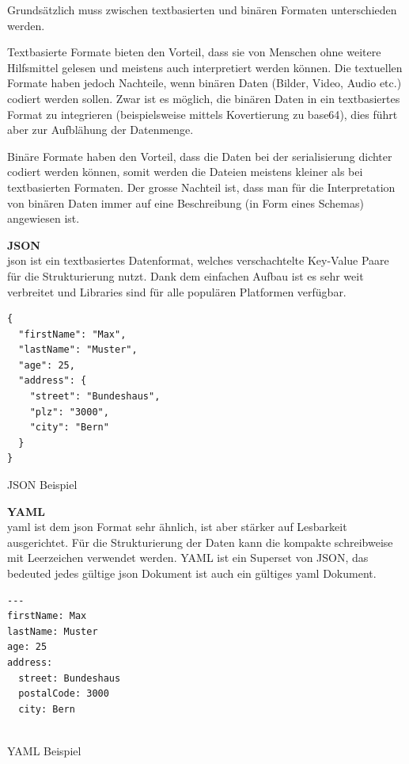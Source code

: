 Grundsätzlich muss zwischen textbasierten und binären Formaten unterschieden werden.

Textbasierte Formate bieten den Vorteil, dass sie von Menschen ohne weitere Hilfsmittel gelesen und meistens auch interpretiert werden können. Die textuellen Formate haben jedoch Nachteile, wenn binären Daten (Bilder, Video, Audio etc.) codiert werden sollen. Zwar ist es möglich, die binären Daten in ein textbasiertes Format zu integrieren (beispielsweise mittels Kovertierung zu \gls{base64}), dies führt aber zur Aufblähung der Datenmenge.

Binäre Formate haben den Vorteil, dass die Daten bei der \gls{serialisierung} dichter codiert werden können, somit werden die Dateien meistens kleiner als bei textbasierten Formaten. Der grosse Nachteil ist, dass man für die Interpretation von binären Daten immer auf eine Beschreibung (in Form eines Schemas) angewiesen ist.

\textbf{JSON} \\
\gls{json} ist ein textbasiertes Datenformat, welches verschachtelte Key-Value Paare für die Strukturierung nutzt. Dank dem einfachen Aufbau ist es sehr weit verbreitet und Libraries sind für alle populären Platformen verfügbar.

\begin{listing}[H]
\begin{verbatim}
{
  "firstName": "Max",
  "lastName": "Muster",
  "age": 25,
  "address": {
    "street": "Bundeshaus",
    "plz": "3000",
    "city": "Bern"
  }
}

\end{verbatim}
\caption{JSON Beispiel}
\end{listing}


\textbf{YAML} \\ 
\gls{yaml} ist dem \gls{json} Format sehr ähnlich, ist aber stärker auf Lesbarkeit ausgerichtet. Für die Strukturierung der Daten kann die kompakte schreibweise mit Leerzeichen verwendet werden. 
YAML ist ein Superset von JSON, das bedeuted jedes gültige \gls{json} Dokument ist auch ein gültiges \gls{yaml} Dokument.

\begin{listing}[H]
\begin{verbatim}
---
firstName: Max
lastName: Muster
age: 25
address: 
  street: Bundeshaus
  postalCode: 3000
  city: Bern


\end{verbatim}
\caption{YAML Beispiel}
\end{listing}

